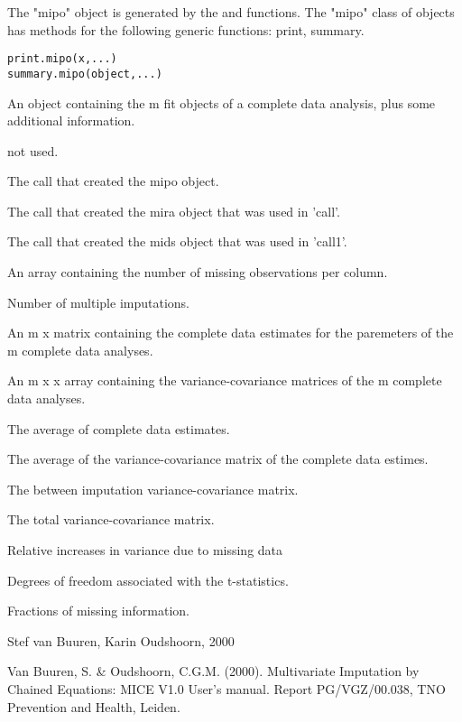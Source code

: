\begin{Description}\relax
The "mipo" object is generated by the  and  functions.
The "mipo" class of objects has methods for the following generic functions:
print, summary.
\end{Description}
\begin{Usage}
\begin{verbatim}
print.mipo(x,...)
summary.mipo(object,...)
\end{verbatim}
\end{Usage}
\begin{Arguments}
\begin{ldescription}
\item[\code{x, object}] An object containing the m fit objects of a complete data analysis, 
plus some additional information.
\item[\code{...}] not used.
\end{ldescription}
\end{Arguments}
\begin{Value}
\begin{ldescription}
\item[\code{call}] The call that created the mipo object.
\item[\code{call1}] The call that created the mira object that was used in 'call'.
\item[\code{call2}] The call that created the mids object that was used in 'call1'.
\item[\code{nmis}] An array containing the number of missing observations per column.
\item[\code{m}] Number of multiple imputations.
\item[\code{qhat}] An m x  matrix containing the complete data estimates for the  paremeters of the m complete data analyses.
\item[\code{u}] An m x  x  array containing the variance-covariance matrices of the m complete data analyses.
\item[\code{qbar}] The average of complete data estimates.
\item[\code{ubar}] The average of the variance-covariance matrix of the complete data estimes.
\item[\code{b}] The between imputation variance-covariance matrix.
\item[\code{t}] The total variance-covariance matrix.
\item[\code{r}] Relative increases in variance due to missing data
\item[\code{df}] Degrees of freedom associated with the t-statistics.
\item[\code{f}] Fractions of missing information.
\end{ldescription}
\end{Value}
\begin{Author}\relax
Stef van Buuren, Karin Oudshoorn, 2000
\end{Author}
\begin{References}\relax
Van Buuren, S. \& Oudshoorn, C.G.M. (2000). Multivariate Imputation by Chained Equations: 
MICE V1.0 User's manual. Report PG/VGZ/00.038, TNO Prevention and Health, Leiden.
\end{References}

